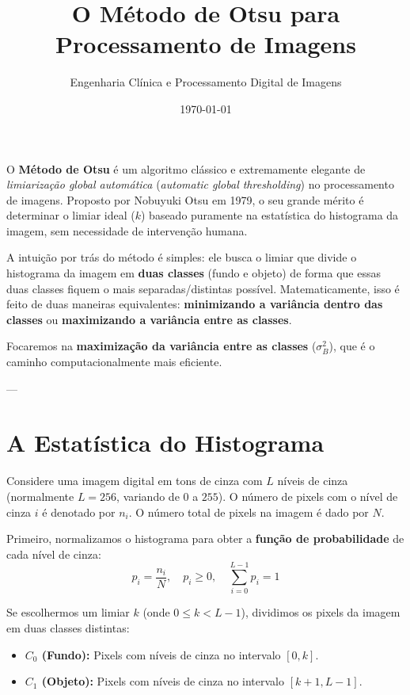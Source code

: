 \documentclass[12pt, a4paper]{article}
\title{\textbf{O Método de Otsu para Processamento de Imagens}}
\author{Engenharia Clínica e Processamento Digital de Imagens}
\date{\today}
\begin{document}
\maketitle

O \textbf{Método de Otsu} é um algoritmo clássico e extremamente elegante de \textit{limiarização global automática} (\textit{automatic global thresholding}) no processamento de imagens. Proposto por Nobuyuki Otsu em 1979, o seu grande mérito é determinar o limiar ideal ($k$) baseado puramente na estatística do histograma da imagem, sem necessidade de intervenção humana.

A intuição por trás do método é simples: ele busca o limiar que divide o histograma da imagem em \textbf{duas classes} (fundo e objeto) de forma que essas duas classes fiquem o mais separadas/distintas possível. Matematicamente, isso é feito de duas maneiras equivalentes: \textbf{minimizando a variância dentro das classes} ou \textbf{maximizando a variância entre as classes}.

Focaremos na \textbf{maximização da variância entre as classes} ($\sigma_B^2$), que é o caminho computacionalmente mais eficiente.

---

\section{A Estatística do Histograma}

Considere uma imagem digital em tons de cinza com $L$ níveis de cinza (normalmente $L = 256$, variando de $0$ a $255$). O número de pixels com o nível de cinza $i$ é denotado por $n_i$. O número total de pixels na imagem é dado por $N$.

Primeiro, normalizamos o histograma para obter a \textbf{função de probabilidade} de cada nível de cinza:
\begin{equation}
    p_i = \frac{n_i}{N}, \quad p_i \ge 0, \quad \sum_{i=0}^{L-1} p_i = 1
\end{equation}

Se escolhermos um limiar $k$ (onde $0 \le k < L-1$), dividimos os pixels da imagem em duas classes distintas:
\begin{itemize}
    \item \textbf{$C_0$ (Fundo):} Pixels com níveis de cinza no intervalo $[0, k]$.
    \item \textbf{$C_1$ (Objeto):} Pixels com níveis de cinza no intervalo $[k+1, L-1]$.
\end{itemize}
\end{document}
